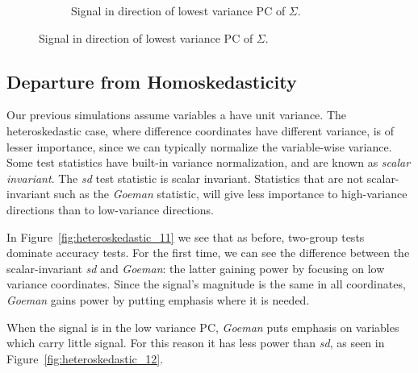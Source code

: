 \documentclass[journal]{IEEEtran}
\begin{document}
\begin{figure}[h]
\begin{subfigure}[t]{.45\columnwidth}
		\caption{Signal in direction of lowest variance PC of $\Sigma$.} 
		\label{fig:dependence_32}
	\end{subfigure}
\end{figure}



\subsection{Departure from Homoskedasticity}

Our previous simulations assume variables a have unit variance. 
The heteroskedastic case, where difference coordinates have different variance, is of lesser importance, since we can typically normalize the variable-wise variance. 
Some test statistics have built-in variance normalization, and are known as \emph{scalar invariant}. 
The \emph{sd} test statistic is scalar invariant. 
Statistics that are not scalar-invariant such as the \emph{Goeman} statistic, will give less importance to high-variance directions than to low-variance directions. 

In Figure~\ref{fig:heteroskedastic_11} we see that as before, two-group tests dominate accuracy tests.
For the first time, we can see the difference between the scalar-invariant \emph{sd} and \emph{Goeman}: the latter gaining power by focusing on low variance coordinates. Since the signal's magnitude is the same in all coordinates, \emph{Goeman} gains power by putting emphasis where it is needed.

When the signal is in the low variance PC, \emph{Goeman} puts emphasis on variables which carry little signal.
For this reason it has less power than \emph{sd}, as seen in Figure~\ref{fig:heteroskedastic_12}.
\end{document}
